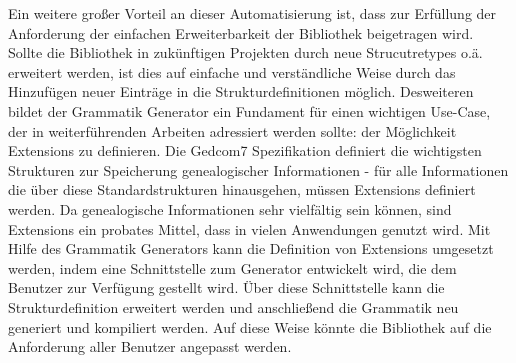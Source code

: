 Ein weitere großer Vorteil an dieser Automatisierung ist, dass zur Erfüllung der Anforderung der einfachen Erweiterbarkeit der Bibliothek beigetragen wird. Sollte die Bibliothek in zukünftigen Projekten durch neue Strucutretypes o.ä. erweitert werden, ist dies auf einfache und verständliche Weise durch das Hinzufügen neuer Einträge in die Strukturdefinitionen möglich. Desweiteren bildet der Grammatik Generator ein Fundament für einen wichtigen Use-Case, der in weiterführenden Arbeiten adressiert werden sollte: der Möglichkeit Extensions zu definieren. Die Gedcom7 Spezifikation definiert die wichtigsten Strukturen zur Speicherung genealogischer Informationen - für alle Informationen die über diese Standardstrukturen hinausgehen, müssen Extensions definiert werden. Da genealogische Informationen sehr vielfältig sein können, sind Extensions ein probates Mittel, dass in vielen Anwendungen genutzt wird. Mit Hilfe des Grammatik Generators kann die Definition von Extensions umgesetzt werden, indem eine Schnittstelle zum Generator entwickelt wird, die dem Benutzer zur Verfügung gestellt wird. Über diese Schnittstelle kann die Strukturdefinition erweitert werden und anschließend die Grammatik neu generiert und kompiliert werden. Auf diese Weise könnte die Bibliothek auf die Anforderung aller Benutzer angepasst werden. 
